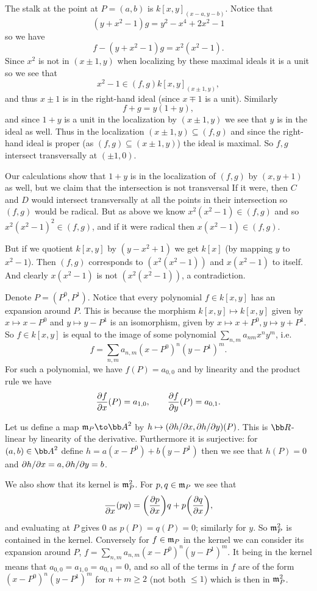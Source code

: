     The stalk at the point at $P=(a,b)$ is $k[x,y]_{(x-a,y-b)}$.
    Notice that
    $$ (y+x^2-1)g = y^2 - x^4 + 2x^2 - 1 $$
    so we have
    $$ f - (y+x^2-1)g = x^2(x^2-1) . $$
    Since $x^2$ is not in $(x\pm1,y)$ when localizing by these maximal ideals it is a unit so we see that
    $$ x^2 - 1 \in (f,g)k[x,y]_{(x\pm1,y)} , $$
    and thus $x\pm1$ is in the right-hand ideal (since $x\mp1$ is a unit).
    Similarly
    $$ f + g = y(1+y) , $$
    and since $1+y$ is a unit in the localization by $(x\pm1,y)$ we see that $y$ is in the ideal as well.
    Thus in the localization $(x\pm1,y)\subseteq(f,g)$ and since the right-hand ideal is proper (as $(f,g)\subseteq(x\pm1,y)$) the ideal is maximal.
    So $f,g$ intersect transversally at $(\pm1,0)$.

    Our calculations show that $1+y$ is in the localization of $(f,g)$ by $(x,y+1)$ as well, but we claim that the intersection is not transversal
    If it were, then $C$ and $D$ would intersect transversally at all the points in their intersection so $(f,g)$ would be radical.
    But as above we know $x^2(x^2-1)\in(f,g)$ and so $x^2(x^2-1)^2\in(f,g)$, and if it were radical then $x(x^2-1)\in(f,g)$.

    But if we quotient $k[x,y]$ by $(y-x^2+1)$ we get $k[x]$ (by mapping $y$ to $x^2-1$).
    Then $(f,g)$ corresponds to $(x^2(x^2-1))$ and $x(x^2-1)$ to itself.
    And clearly $x(x^2-1)$ is not $(x^2(x^2-1))$, a contradiction.

    \item Denote $P=(P^0,P^1)$.
    Notice that every polynomial $f\in k[x,y]$ has an expansion around $P$.
    This is because the morphism $k[x,y]\mapsto k[x,y]$ given by $x\mapsto x-P^0$ and $y\mapsto y-P^1$ is an isomorphism, given by $x\mapsto x+P^0,y\mapsto y+P^1$.
    So $f\in k[x,y]$ is equal to the image of some polynomial $\sum_{n,m}a_{nm}x^ny^m$, i.e.
    $$ f = \sum_{n,m}a_{n,m}(x-P^0)^n(y-P^1)^m . $$
    For such a polynomial, we have $f(P)=a_{0,0}$ and by linearity and the product rule we have
    $$ {{\partial f}\over{\partial x}}(P) = a_{1,0},\qquad {{\partial f}\over{\partial y}}(P) = a_{0,1} . $$

    Let us define a map $\m_P\to\bA^2$ by $h\mapsto({\partial h}/{\partial x},{\partial h}/{\partial y})(P)$.
    This is $\bR$-linear by linearity of the derivative.
    Furthermore it is surjective: for $(a,b)\in\bA^2$ define $h=a(x-P^0)+b(y-P^1)$ then we see that $h(P)=0$ and ${\partial h}/{\partial x}=a,{\partial h}/{\partial y}=b$.

    We also show that its kernel is ${{\frak m}}_P^2$.
    For $p,q\in{{\frak m}}_P$ we see that
    $$ {{}\over{\partial x}}(pq) = \mathopen{}\mathclose{\left({{\partial p}\over{\partial x}}\right)}q + p\mathopen{}\mathclose{\left({{\partial q}\over{\partial x}}\right)} , $$
    and evaluating at $P$ gives $0$ as $p(P)=q(P)=0$; similarly for $y$.
    So ${{\frak m}}_P^2$ is contained in the kernel.
    Conversely for $f\in{{\frak m}}_P$ in the kernel we can consider its expansion around $P$, $f=\sum_{n,m}a_{n,m}(x-P^0)^n(y-P^1)^m$.
    It being in the kernel means that $a_{0,0}=a_{1,0}=a_{0,1}=0$, and so all of the terms in $f$ are of the form $(x-P^0)^n(y-P^1)^m$ for $n+m\geq2$ (not both $\leq1$)
    which is then in ${{\frak m}}_P^2$.

